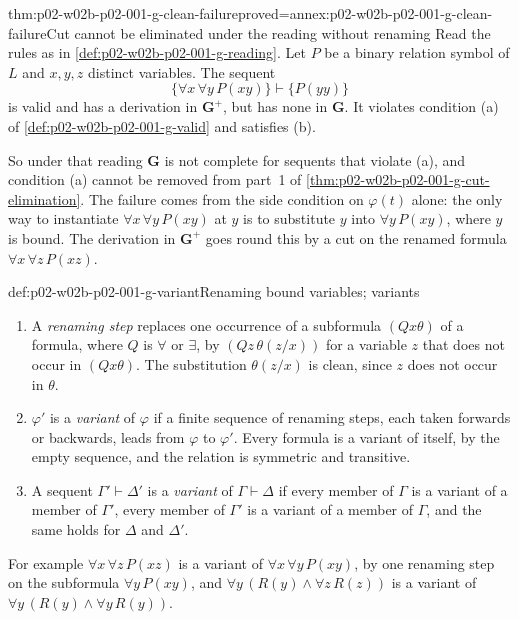 \begin{hbtheorem}{thm:p02-w02b-p02-001-g-clean-failure}{proved=annex:p02-w02b-p02-001-g-clean-failure}{Cut cannot be eliminated under the reading without renaming}
Read the rules as in \cref{def:p02-w02b-p02-001-g-reading}.  Let \(P\) be a
binary relation symbol of \(L\) and \(x,y,z\) distinct variables.  The
sequent
\[
\{\forall x\,\forall y\,P(xy)\}\vdash\{P(yy)\}
\]
is valid and has a derivation in \(\mathbf G^{+}\), but has none in
\(\mathbf G\).  It violates condition (a) of
\cref{def:p02-w02b-p02-001-g-valid} and satisfies (b).
\end{hbtheorem}

So under that reading \(\mathbf G\) is not complete for sequents that
violate (a), and condition (a) cannot be removed from part~1 of
\cref{thm:p02-w02b-p02-001-g-cut-elimination}.  The failure comes from the
side condition on \(\varphi(t)\) alone: the only way to instantiate
\(\forall x\,\forall y\,P(xy)\) at \(y\) is to substitute \(y\) into
\(\forall y\,P(xy)\), where \(y\) is bound.  The derivation in
\(\mathbf G^{+}\) goes round this by a cut on the renamed formula
\(\forall x\,\forall z\,P(xz)\).

\begin{hbdefinition}{def:p02-w02b-p02-001-g-variant}{Renaming bound variables; variants}
\begin{enumerate}
\item A \emph{renaming step} replaces one occurrence of a subformula
      \((Qx\theta)\) of a formula, where \(Q\) is \(\forall\) or
      \(\exists\), by \((Qz\,\theta(z/x))\) for a variable \(z\) that does
      not occur in \((Qx\theta)\).  The substitution \(\theta(z/x)\) is
      clean, since \(z\) does not occur in \(\theta\).
\item \(\varphi'\) is a \emph{variant} of \(\varphi\) if a finite sequence
      of renaming steps, each taken forwards or backwards, leads from
      \(\varphi\) to \(\varphi'\).  Every formula is a variant of itself,
      by the empty sequence, and the relation is symmetric and transitive.
\item A sequent \(\Gamma'\vdash\Delta'\) is a \emph{variant} of
      \(\Gamma\vdash\Delta\) if every member of \(\Gamma\) is a variant of a
      member of \(\Gamma'\), every member of \(\Gamma'\) is a variant of a
      member of \(\Gamma\), and the same holds for \(\Delta\) and
      \(\Delta'\).
\end{enumerate}
For example \(\forall x\,\forall z\,P(xz)\) is a variant of
\(\forall x\,\forall y\,P(xy)\), by one renaming step on the subformula
\(\forall y\,P(xy)\), and \(\forall y\,(R(y)\land\forall z\,R(z))\) is a
variant of \(\forall y\,(R(y)\land\forall y\,R(y))\).
\end{hbdefinition}

